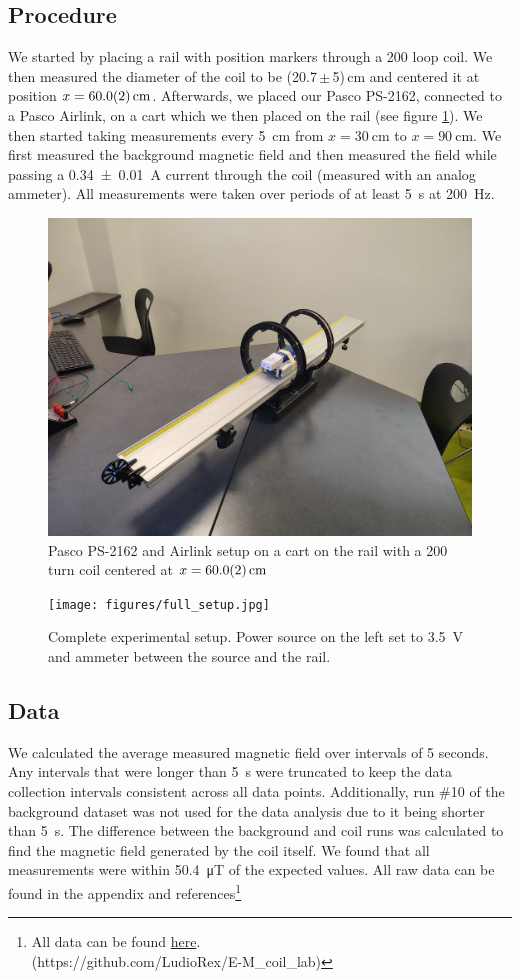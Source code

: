 \subsection{Procedure}
We started by placing a rail with position markers through a 200 loop coil. We then measured the diameter of the coil to be (20.7\,$\pm$\,5)\,cm and centered it at position $x=\SI{60 \pm 0.2}{\centi\metre}$. Afterwards, we placed our Pasco PS-2162, connected to a Pasco Airlink, on a cart which we then placed on the rail (see figure \ref{fig: Cart and rail}). We then started taking measurements every \SI{5}{\centi\metre} from $x=\SI{30}{\centi\metre}$ to $x=\SI{90}{\centi\metre}$. We first measured the background magnetic field and then measured the field while passing a \SI{0.34 \pm 0.01}{\ampere} current through the coil (measured with an analog ammeter). All measurements were taken over periods of at least \SI{5}{\second} at \SI{200}{\hertz}.

\begin{figure}
    \centering
    \includegraphics[width=0.5\linewidth]{figures/cart_and_rail.jpg}
    \caption{Pasco PS-2162 and Airlink setup on a cart on the rail with a 200 turn coil centered at $x=\SI{60 \pm 0.2}{\centi\metre}$}
    \label{fig: Cart and rail}
\end{figure}

\begin{figure}
    \centering
    \texttt{[image: figures/full\_setup.jpg]}
    \caption{Complete experimental setup. Power source on the left set to \SI{3.5}{\volt} and ammeter between the source and the rail.}
    \label{fig: Full setup}
\end{figure}

\subsection{Data}
We calculated the average measured magnetic field over intervals of 5 seconds. Any intervals that were longer than \SI{5}{s} were truncated to keep the data collection intervals consistent across all data points. Additionally, run \#10 of the background dataset was not used for the data analysis due to it being shorter than \SI{5}{\second}. The difference between the background and coil runs was calculated to find the magnetic field generated by the coil itself. We found that all measurements were within \SI{50.4}{\micro\tesla} of the expected values. All raw data can be found in the appendix and references\footnote{All data can be found \href{https://github.com/LudioRex/E-M_coil_lab}{here}.\\(https://github.com/LudioRex/E-M\_coil\_lab)}

